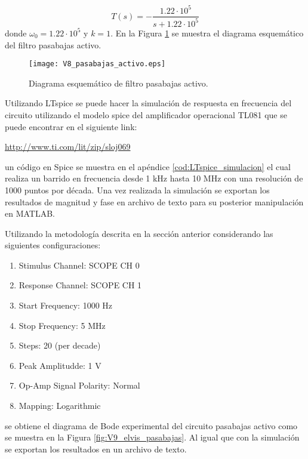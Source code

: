 	\begin{equation}
		T(s) = - \frac{1.22 \cdot 10^{5}}{s + 1.22 \cdot 10^{5}}
	\end{equation}
	donde $\omega_{0} = 1.22 \cdot 10^{5} $ y $k = 1$. En la Figura \ref{fig:V8_pasabajas_activo} se muestra el diagrama esquemático del filtro pasabajas activo.
	
	\begin{figure}[hbtp]
		\caption{Diagrama esquemático de filtro pasabajas activo.}
		\label{fig:V8_pasabajas_activo}
		\centering
		\texttt{[image: V8\_pasabajas\_activo.eps]}
	\end{figure}
	
	Utilizando LTspice se puede hacer la simulación de respuesta en frecuencia del circuito utilizando el modelo spice del amplificador operacional TL081 que se puede encontrar en el siguiente link:
	
	\begin{center}
		\url{http://www.ti.com/lit/zip/sloj069}
	\end{center}
	un código en Spice se muestra en el apéndice \ref{cod:LTspice_simulacion} el cual realiza un barrido en frecuencia desde 1 kHz hasta 10 MHz con una resolución de 1000 puntos por década. Una vez realizada la simulación se exportan los resultados de magnitud y fase en archivo de texto para su posterior manipulación en MATLAB.
	
	Utilizando la metodología descrita en la sección anterior considerando las siguientes configuraciones:
	\begin{multicols}{2}
	    \begin{enumerate}[label=\alph*.]
	    	\item Stimulus Channel: SCOPE CH 0
			\item Response Channel: SCOPE CH 1 
			\item Start Frequency:	1000 Hz
			\item Stop Frequency:	5 MHz
			\item Steps:			20 (per decade)
			\item Peak Amplitudde:	1 V
			\item Op-Amp Signal Polarity: Normal
			\item Mapping:			Logarithmic
	    \end{enumerate}
	\end{multicols}
	\noindent
	se obtiene el diagrama de Bode experimental del circuito pasabajas activo como se muestra en la Figura \ref{fig:V9_elvis_pasabajas}. Al igual que con la simulación se exportan los resultados en un archivo de texto.
	

